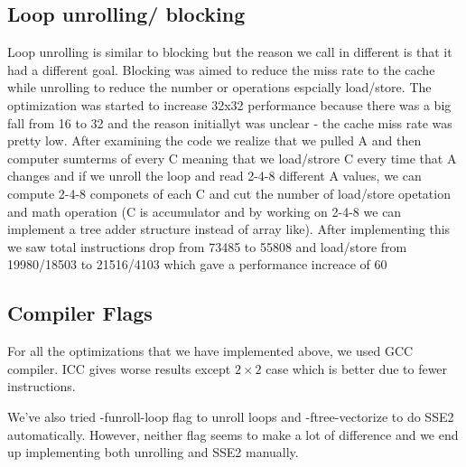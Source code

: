 \documentclass{article}
\begin{document}
\subsection{Loop unrolling/ blocking}
Loop unrolling is similar to blocking but the reason we call in different is that it had a different goal. Blocking was aimed to reduce the miss rate to the cache while unrolling to reduce the number or operations espcially load/store.
The optimization was started to increase 32x32 performance because there was a big fall from 16 to 32 and the reason initiallyt was unclear - the cache miss rate was pretty low. After examining the code we realize that we pulled A and then computer sumterms of every C meaning that we load/strore C every time that A changes and if we unroll the loop and read 2-4-8 different A values, we can compute 2-4-8 componets of each C and cut the number of load/store opetation and math operation (C is accumulator and by working on 2-4-8 we can implement a tree adder structure instead of array like). After implementing this we saw total instructions drop from 73485 to 55808 and load/store from 19980/18503 to 21516/4103 which gave a performance increace of 60%

\subsection{Compiler Flags}
For all the optimizations that we have implemented above, we used GCC compiler.  ICC gives worse results except $2 \times 2$ case which is better due to fewer instructions.

We've also tried -funroll-loop flag to unroll loops and -ftree-vectorize to do SSE2 automatically.  However, neither flag seems to make a lot of difference and we end up implementing both unrolling and SSE2 manually.
\end{document}
